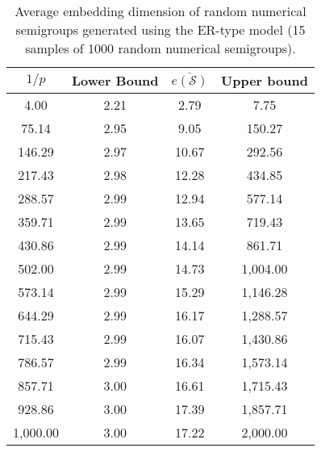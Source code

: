 \begin{table}
\centering
\begin{tabular}{|c|c|c|c|}
    \hline
    $1/p$ & Lower Bound & $\overline{e(\mathcal{S})}$  & Upper bound \\
    \hline
    4.00 & 2.21 & 2.79 & 7.75 \\
    75.14 & 2.95 & 9.05 & 150.27 \\
    146.29 & 2.97 & 10.67 & 292.56 \\
    217.43 & 2.98 & 12.28 & 434.85 \\
    288.57 & 2.99 & 12.94 & 577.14 \\
    359.71 & 2.99 & 13.65 & 719.43 \\
    430.86 & 2.99 & 14.14 & 861.71 \\
    502.00 & 2.99 & 14.73 & 1,004.00 \\
    573.14 & 2.99 & 15.29 & 1,146.28 \\
    644.29 & 2.99 & 16.17 & 1,288.57 \\
    715.43 & 2.99 & 16.07 & 1,430.86 \\
    786.57 & 2.99 & 16.34 & 1,573.14 \\
    857.71 & 3.00 & 16.61 & 1,715.43 \\
    928.86 & 3.00 & 17.39 & 1,857.71 \\
    1,000.00 & 3.00 & 17.22 & 2,000.00 \\
    \hline
\end{tabular}
\caption{Average embedding dimension of random numerical semigroups generated using the ER-type model (15 samples of 1000 random numerical semigroups).}
\label{tab:embedding}
\end{table}

